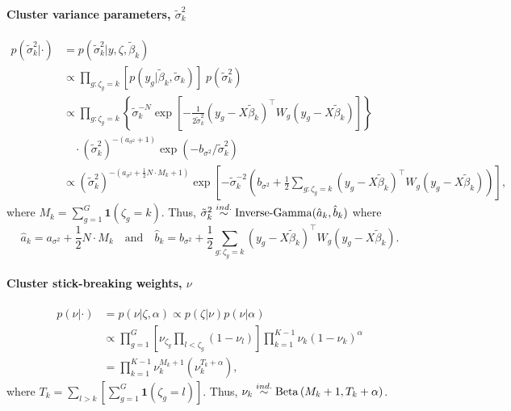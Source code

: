 \paragraph{Cluster variance parameters, $\tilde{\sigma}^2_k$}
\begin{align*}
p(\tilde{\sigma}^2_k|\cdot) & = p(\tilde{\sigma}^2_k|y, \zeta, \tilde{\beta}_k) \\
& \propto \prod_{g:\zeta_g=k} \left[ p(y_g|\tilde{\beta}_k, \tilde{\sigma}_k)\right]\; p(\tilde{\sigma}^2_k)\\
& \propto \prod_{g:\zeta_g=k}  \left\{ \tilde{\sigma}_k^{-N} \exp \left[ -\frac{1}{2\tilde{\sigma}^2_k} \left( y_g - X\tilde{\beta}_k \right)^\top W_g \left( y_g - X\tilde{\beta}_k \right) \right]\right\}\\
& \quad \cdot (\tilde{\sigma}_k^2)^{-(a_{\sigma^2}+1)} \exp\left(-b_{\sigma^2}/\tilde{\sigma}^2_k\right)\\
& \propto (\tilde{\sigma}_k^2)^{-(a_{\sigma^2} + \frac{1}{2}N\cdot M_k + 1)} \exp \left[ -\tilde{\sigma}_k^{-2} \left( b_{\sigma^2} + \frac{1}{2} \sum_{g:\zeta_g=k} \left( y_g - X\tilde{\beta}_k \right)^\top W_g \left( y_g - X\tilde{\beta}_k \right) \right) \right],
\end{align*}
where $M_k = \sum_{g=1}^G \bm{1}(\zeta_g=k)$.
Thus, $\tilde{\sigma}^2_k \stackrel{ind.}{\sim} \operatorname{Inverse-Gamma}(\hat{a}_k, \hat{b}_k)$ where
\begin{equation*}
\hat{a}_k=a_{\sigma^2} + \frac{1}{2}N\cdot M_k \quad \mbox{and} \quad \hat{b}_k=b_{\sigma^2} + \frac{1}{2} \sum_{g:\zeta_g=k} \left( y_g - X\tilde{\beta}_k \right)^\top W_g \left( y_g - X\tilde{\beta}_k \right).
\end{equation*}

\paragraph{Cluster stick-breaking weights, $\nu$}
\begin{align*}
p(\nu|\cdot) & = p(\nu|\zeta,\alpha) \propto p(\zeta|\nu) p(\nu|\alpha)\\
& \propto \prod_{g=1}^G \left[ \nu_{\zeta_g} \prod_{l<\zeta_g}(1-\nu_l) \right] \prod_{k=1}^{K-1} \nu_k(1-\nu_k)^\alpha\\
& = \prod_{k=1}^{K-1} \nu_k^{M_k+1}(\nu_k^{T_k+\alpha}),
\end{align*}
where $T_k = \sum_{l>k}\left[\sum_{g=1}^G\bm{1}(\zeta_g=l)\right]$.
Thus, $\nu_k \stackrel{ind.}{\sim} \operatorname{Beta}\left(M_k+1, T_k+\alpha\right)$.


